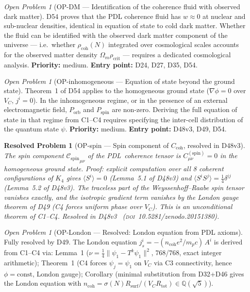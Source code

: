 \documentclass[11pt,a4paper]{article}
\newtheorem{resolvedproblem}{Resolved Problem}
\newcommand{\Cspin}{{\mathcal{C}_{\mathrm{spin}}}}
\theoremstyle{plain}
\theoremstyle{definition}
\theoremstyle{remark}
\newtheorem{openproblem}[theorem]{Open Problem}
\newcommand{\PDL}{\textnormal{PDL}}
\newcommand{\Rsurf}{R_{\mathrm{surf}}}
\newcommand{\Rtot}{R_{\mathrm{tot}}}
\newcommand{\rhocoh}{\rho_{\mathrm{coh}}}
\newcommand{\Ccoh}{C_{\mathrm{coh}}}
\begin{document}
\begin{openproblem}[OP-DM --- Identification of the coherence fluid with observed dark matter]
\label{op:DM}
D54 proves that the PDL coherence fluid has $w \approx 0$ at nuclear and sub-nuclear densities, identical in equation of state to cold dark matter. Whether the fluid can be identified with the observed dark matter component of the universe --- i.e.\ whether $\rhocoh(N)$ integrated over cosmological scales accounts for the observed matter density $\Omega_m \rho_{\mathrm{crit}}$ --- requires a dedicated cosmological analysis. \textbf{Priority:} medium. \textbf{Entry point:} D24, D27, D35, D54.
\end{openproblem}

\begin{openproblem}[OP-inhomogeneous --- Equation of state beyond the ground state]
\label{op:inhomogeneous}
Theorem~1 of D54 applies to the homogeneous ground state ($\nabla\phi = 0$ over $V_C$, $j^i = 0$). In the inhomogeneous regime, or in the presence of an external electromagnetic field, $P_{\mathrm{orb}}$ and $P_{\mathrm{spin}}$ are non-zero. Deriving the full equation of state in that regime from C1--C4 requires specifying the inter-cell distribution of the quantum state $\psi$. \textbf{Priority:} medium. \textbf{Entry point:} D48v3, D49, D54.
\end{openproblem}

\begin{resolvedproblem}[OP-spin --- Spin component of $\Ccoh$, resolved in D48v3]
\label{op:spin}
The spin component $\Cspin_{\mu\nu}$ of the \PDL\ coherence tensor is $C^{(\mathrm{spin})}_{\mu\nu} = 0$ in the homogeneous ground state. Proof: explicit computation over all 8 coherent configurations of $K_4$ gives $\langle S^i\rangle = 0$ (Lemma~5.1 of D48v3) and $\langle S^i S^j\rangle = \tfrac{1}{4}\delta^{ij}$ (Lemma~5.2 of D48v3). The traceless part of the Weyssenhoff--Raabe spin tensor vanishes exactly, and the isotropic gradient term vanishes by the London gauge theorem of D49 (C4 forces uniform phase over $V_C$). This is an unconditional theorem of C1--C4. Resolved in D48v3~\cite{D48} (\textsc{doi}~10.5281/zenodo.20151380).
\end{resolvedproblem}

\begin{openproblem}[OP-London --- Resolved: London equation from PDL axioms]
\label{op:London}
\textcolor{proofblue}{Fully resolved by D49.} The London equation $j^i_s = -(n_{\mathrm{coh}} e^2/m_p c)\,A^i$ is derived from C1--C4 via: Lemma~1 ($\nu = \tfrac{1}{4}\|\psi_1 - T^k\psi_1\|^2$, 768/768, exact integer arithmetic); Theorem~1 (C4 forces $\psi_j = \psi_1$ on $V_C$ via C3 connectivity, hence $\phi = \mathrm{const}$, London gauge); Corollary (minimal substitution from D32+D46 gives the London equation with $n_{\mathrm{coh}} = \sigma(N)\Rsurf/(V_C\Rtot) \in \mathbb{Q}(\sqrt{5})$).
\end{openproblem}
\end{document}
